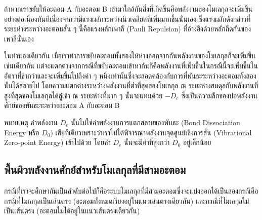 ถ้าหากเราขยับให้อะตอม A กับอะตอม B เข้ามาใกล้กันสิ่งที่เกิดขึ้นคือพลังงานของโมเลกุลจะเพิ่มขึ้นอย่างต่อเนื่องทันทีเนื่องจากว่ามีแรงผลักระหว่างนิวเคลียสที่เพิ่มมากขึ้นนั่นเอง ซึ่งแรงผลักดังกล่าวที่ระยะห่างระหว่างอะตอมสั้น ๆ นี้คือแรงผลักเพาลี (Pauli Repulsion) ที่อ้างอิงด้วยหลักกีดกันของเพาลีนั่นเอง

ในทำนองเดียวกัน เมื่อเราทำการขยับอะตอมทั้งสองให้ห่างออกจากกันพลังงานของโมเลกุลก็จะเพิ่มขึ้นเช่นเดียวกัน แต่จะแตกต่างจากกรณีที่ขยับอะตอมเข้าหากันก็คือพลังงานที่เพิ่มขึ้นในกรณีนี้จะเพิ่มขึ้นในอัตราที่ช้ากว่าและจะเพิ่มขึ้นไปถึงค่า ๆ หนึ่งเท่านั้นซึ่งจะสอดคล้องกับการที่พันธะระหว่างอะตอมทั้งสองนั้นได้สลายไป โดยความแตกต่างระหว่างพลังงานที่ต่ำที่สุดของโมเลกุล ณ ระยะห่างสมดุลกับพลังงานที่สูงที่สุดของโมเลกุลได้ลู่เข้า ณ ระยะห่างที่มาก ๆ นั้นจะแทนด้วย $-D_{e}$ ซึ่งเป็นความลึกของบ่อพลังงานศักย์ของพันธะระหว่างอะตอม A กับอะตอม B

หมายเหตุ ค่าพลังงาน $D_{e}$ นั้นไม่ใช่ค่าพลังงานการแตกสลายของพันธะ (Bond Dissociation Energy หรือ $D_{0}$) เสียทีเดียวเพราะว่าเราไม่ได้พิจารณาพลังงานจุดศูนย์เชิงการสั่น (Vibrational Zero-point Energy) เข้าไปด้วย โดยค่า $D_{e}$ นั้นจะมีค่าที่สูงกว่า $D_{0}$ อยู่เล็กน้อย

\subsection{พื้นผิวพลังงานศักย์สำหรับโมเลกุลที่มีสามอะตอม}
\label{ssec:pes_3_atoms}

กรณีที่เราจะศึกษากันเป็นลำดับต่อไปก็คือระบบโมเลกุลที่มีสามอะตอมซึ่งจะแบ่งออกได้เป็นสองกรณีคือกรณีที่โมเลกุลเป็นเส้นตรง (อะตอมทั้งหมดเรียงอยู่ในแนวเส้นตรงเดียวกัน) และกรณีที่โมเลกุลไม่เป็นเส้นตรง (อะตอมไม่ได้อยู่ในแนวเส้นตรงเดียวกัน)

